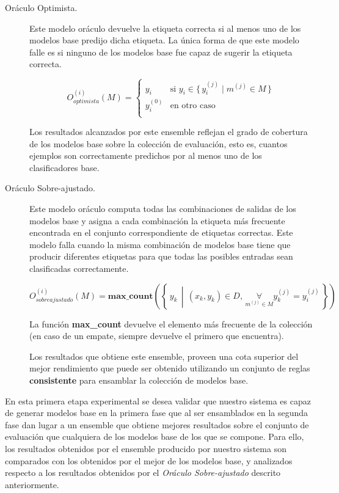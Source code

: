\begin{description}

\item[Oráculo Optimista.]
Este modelo oráculo devuelve la etiqueta correcta si al menos uno de los modelos base predijo dicha etiqueta.
La única forma de que este modelo falle es si ninguno de los modelos base fue capaz de sugerir la etiqueta correcta.

\begin{equation*}
O_{optimista}^{(i)}(M) =
    \begin{cases}
        y_i & \textrm{si $y_i \in \{\,y^{(j)}_i \mid m^{(j)} \in M \,\}$} \\
        y^{(0)}_i & \textrm{en otro caso} \\
    \end{cases}
\end{equation*}

Los resultados alcanzados por este ensemble reflejan el grado de cobertura de los modelos base sobre la colección de evaluación, esto es, cuantos ejemplos son correctamente predichos por al menos uno de los clasificadores base.

\item[Oráculo Sobre-ajustado.]
Este modelo oráculo computa todas las combinaciones de salidas de los modelos base y asigna a cada combinación la etiqueta más frecuente encontrada en el conjunto correspondiente de etiquetas correctas.
Este modelo falla cuando la misma combinación de modelos base tiene que producir diferentes etiquetas para que todas las posibles entradas sean clasificadas correctamente.

\begin{equation*}
O_{sobreajustado}^{(i)}(M) =
    \textbf{max\_count}\left(\left\{\, y_k \,\middle\vert\, (x_k, y_k) \in D, \, \underset{m^{(j)} \in M}{\forall} y^{(j)}_k = y^{(j)}_i \,\right\}\right)
\end{equation*}

La función \textbf{max\_count} devuelve el elemento más frecuente de la colección (en caso de un empate, siempre devuelve el primero que encuentra).

Los resultados que obtiene este ensemble, proveen una cota superior del mejor rendimiento que puede ser obtenido utilizando un conjunto de reglas \textbf{consistente} para ensamblar la colección de modelos base.

\end{description}

En esta primera etapa experimental se desea validar que nuestro sistema es capaz de generar modelos base en la primera fase que al ser ensamblados en la segunda fase dan lugar a un ensemble que obtiene mejores resultados sobre el conjunto de evaluación que cualquiera de los modelos base de los que se compone.
Para ello, los resultados obtenidos por el ensemble producido por nuestro sistema son comparados con los obtenidos por el mejor de los modelos base, y analizados respecto a los resultados obtenidos por el \emph{Oráculo Sobre-ajustado} descrito anteriormente.

